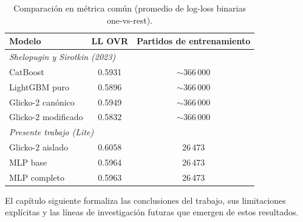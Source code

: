 \begin{table}[htbp]
	\centering
	\caption{Comparaci\'on en m\'etrica com\'un (promedio de log-loss binarias one-vs-rest).}
	\label{tab:comparativa_ovr}
	\begin{tabular}{lcc}
		\toprule
		\textbf{Modelo} & \textbf{LL OVR} & \textbf{Partidos de entrenamiento} \\
		\midrule
		\multicolumn{3}{l}{\textit{Shelopugin y Sirotkin (2023)}} \\
		CatBoost & 0.5931 & $\sim$366\,000 \\
		LightGBM puro & 0.5896 & $\sim$366\,000 \\
		Glicko-2 can\'onico & 0.5949 & $\sim$366\,000 \\
		Glicko-2 modificado & 0.5832 & $\sim$366\,000 \\
		\midrule
		\multicolumn{3}{l}{\textit{Presente trabajo (Lite)}} \\
		Glicko-2 aislado & 0.6058 & 26\,473 \\
		MLP base & 0.5964 & 26\,473 \\
		MLP completo & 0.5963 & 26\,473 \\
		\bottomrule
	\end{tabular}
\end{table}

El cap\'itulo siguiente formaliza las conclusiones del trabajo, sus limitaciones expl\'icitas y las l\'ineas de investigaci\'on futuras que emergen de estos resultados.